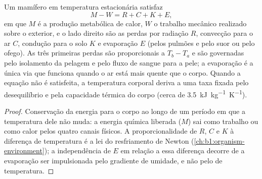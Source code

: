 \begin{proposition}\label{prop:b1:mammal-organization:heatbudget}
Um mamífero em temperatura estacionária satisfaz
\[
M - W = R + C + K + E ,
\]
em que $M$ é a produção metabólica de calor, $W$ o trabalho mecânico
realizado sobre o exterior, e o lado direito são as perdas por radiação
$R$, convecção para o ar $C$, condução para o solo $K$ e evaporação $E$
(pelos pulmões e pelo suor ou pelo ofego). As três primeiras perdas são
proporcionais a $T_b - T_a$ e são governadas pelo isolamento da pelagem
e pelo fluxo de sangue para a pele; a evaporação é a única via que
funciona quando o ar está mais quente que o corpo. Quando a equação não
é satisfeita, a temperatura corporal deriva a uma taxa fixada pelo
desequilíbrio e pela capacidade térmica do corpo (cerca de
\qty{3.5}{kJ.kg^{-1}.K^{-1}}).
\end{proposition}
\begin{proof}
Conservação da energia para o corpo ao longo de um período em que a
temperatura dele não muda: a energia química liberada ($M$) sai como
trabalho ou como calor pelos quatro canais físicos. A proporcionalidade
de $R$, $C$ e $K$ à diferença de temperatura é a lei do resfriamento de
Newton (\cref{ch:b1:organism-environment}); a independência de $E$ em
relação a essa diferença decorre de a evaporação ser impulsionada pelo
gradiente de umidade, e não pelo de temperatura.
\end{proof}

